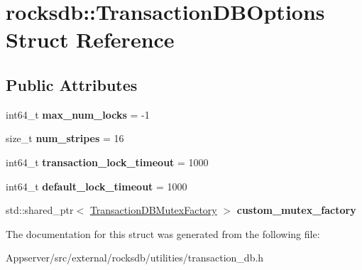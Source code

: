 \hypertarget{structrocksdb_1_1TransactionDBOptions}{}\section{rocksdb\+:\+:Transaction\+D\+B\+Options Struct Reference}
\label{structrocksdb_1_1TransactionDBOptions}
\subsection*{Public Attributes}
\begin{DoxyCompactItemize}
\item 
int64\+\_\+t {\bfseries max\+\_\+num\+\_\+locks} = -\/1\hypertarget{structrocksdb_1_1TransactionDBOptions_a9fe31edbbceadb685ec193e3affcc3ad}{}\label{structrocksdb_1_1TransactionDBOptions_a9fe31edbbceadb685ec193e3affcc3ad}

\item 
size\+\_\+t {\bfseries num\+\_\+stripes} = 16\hypertarget{structrocksdb_1_1TransactionDBOptions_a185a40d4cf4ec94eab4005a55baad81f}{}\label{structrocksdb_1_1TransactionDBOptions_a185a40d4cf4ec94eab4005a55baad81f}

\item 
int64\+\_\+t {\bfseries transaction\+\_\+lock\+\_\+timeout} = 1000\hypertarget{structrocksdb_1_1TransactionDBOptions_a498a9127c6dc667778d2d96eabe51894}{}\label{structrocksdb_1_1TransactionDBOptions_a498a9127c6dc667778d2d96eabe51894}

\item 
int64\+\_\+t {\bfseries default\+\_\+lock\+\_\+timeout} = 1000\hypertarget{structrocksdb_1_1TransactionDBOptions_a52846e704ceab0c17ef3314829116703}{}\label{structrocksdb_1_1TransactionDBOptions_a52846e704ceab0c17ef3314829116703}

\item 
std\+::shared\+\_\+ptr$<$ \hyperlink{classrocksdb_1_1TransactionDBMutexFactory}{Transaction\+D\+B\+Mutex\+Factory} $>$ {\bfseries custom\+\_\+mutex\+\_\+factory}\hypertarget{structrocksdb_1_1TransactionDBOptions_aa49aaee18b556cde246bb27071389497}{}\label{structrocksdb_1_1TransactionDBOptions_aa49aaee18b556cde246bb27071389497}

\end{DoxyCompactItemize}


The documentation for this struct was generated from the following file\+:\begin{DoxyCompactItemize}
\item 
Appserver/src/external/rocksdb/utilities/transaction\+\_\+db.\+h\end{DoxyCompactItemize}
